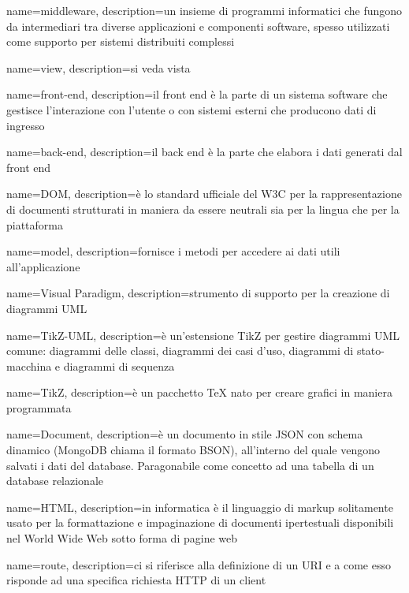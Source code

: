  {
	name=middleware,
	description={un insieme di programmi informatici che fungono da intermediari tra diverse applicazioni e componenti software,  spesso utilizzati come supporto per sistemi distribuiti complessi}
}

 {
	name=view,
	description={si veda vista}
}

 {
	name=front-end,
	description={il front end è la parte di un sistema software che gestisce l'interazione con l'utente o con sistemi esterni che producono dati di ingresso}
}

 {
	name=back-end,
	description={il back end è la parte che elabora i dati generati dal front end}
}

 {
	name=DOM,
	description={è lo standard ufficiale del W3C per la rappresentazione di documenti strutturati in maniera da essere neutrali sia per la lingua che per la piattaforma}
}

 {
	name=model,
	description={fornisce i metodi per accedere ai dati utili all'applicazione}
}

 {
	name=Visual Paradigm,
	description={strumento di supporto per la creazione di diagrammi UML}
}

 {
	name=TikZ-UML,
	description={è un'estensione TikZ per gestire diagrammi UML comune: diagrammi delle classi, diagrammi dei casi d'uso, diagrammi di stato-macchina e diagrammi di sequenza}
}

 {
	name=TikZ,
	description={è un pacchetto TeX nato per creare grafici in maniera programmata}
}

 {
	name=Document,
	description={è un documento in stile JSON con schema dinamico (MongoDB chiama il formato BSON), all'interno del quale vengono salvati i dati del database. Paragonabile come concetto ad una tabella di un database relazionale}
}

 {
	name=HTML,
	description={in informatica è il linguaggio di markup solitamente usato per la formattazione e impaginazione di documenti ipertestuali disponibili nel World Wide Web sotto forma di pagine web}
}

 {
	name=route,
	description={ci si riferisce alla definizione di un URI e a come esso risponde ad una specifica richiesta HTTP di un client}
}

